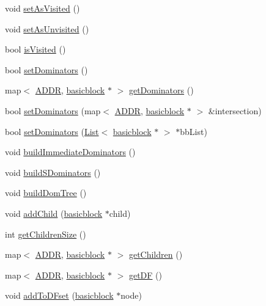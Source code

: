 \begin{DoxyCompactItemize}
\item 
void \hyperlink{classbasicblock_adb3d7c691e7974f77619409fe4a24335}{setAsVisited} ()
\item 
void \hyperlink{classbasicblock_a810b34c12cbddff700700341734ddc5d}{setAsUnvisited} ()
\item 
bool \hyperlink{classbasicblock_ad40cc70b314779ab7d0990813d3053d4}{isVisited} ()
\item 
bool \hyperlink{classbasicblock_aae21234b7ccd801b037a3a26a11d44e7}{setDominators} ()
\item 
map$<$ \hyperlink{binaryTranslator_2global_8h_aa4557b0650cb21e57e3e4623410832c6}{ADDR}, \hyperlink{classbasicblock}{basicblock} $\ast$ $>$ \hyperlink{classbasicblock_aec14cf5254976daec791c62e1b684ecf}{getDominators} ()
\item 
bool \hyperlink{classbasicblock_a9e417b7d2b2cb87281b4c8ed1b10d566}{setDominators} (map$<$ \hyperlink{binaryTranslator_2global_8h_aa4557b0650cb21e57e3e4623410832c6}{ADDR}, \hyperlink{classbasicblock}{basicblock} $\ast$ $>$ \&intersection)
\item 
bool \hyperlink{classbasicblock_aafd371f1d5701ae15546178a153ca23d}{setDominators} (\hyperlink{classList}{List}$<$ \hyperlink{classbasicblock}{basicblock} $\ast$ $>$ $\ast$bbList)
\item 
void \hyperlink{classbasicblock_a668baef0263404790b8b03e336b96dda}{buildImmediateDominators} ()
\item 
void \hyperlink{classbasicblock_ad88c3d7891025016b9de9f3bfb2b3ddb}{buildSDominators} ()
\item 
void \hyperlink{classbasicblock_a8e7863ba06ca7f2418f1f423e6f71e8a}{buildDomTree} ()
\item 
void \hyperlink{classbasicblock_abb47633a30d4722992c2d961a4a4ad14}{addChild} (\hyperlink{classbasicblock}{basicblock} $\ast$child)
\item 
int \hyperlink{classbasicblock_a150ce672b4864265713b242b74b3ca30}{getChildrenSize} ()
\item 
map$<$ \hyperlink{binaryTranslator_2global_8h_aa4557b0650cb21e57e3e4623410832c6}{ADDR}, \hyperlink{classbasicblock}{basicblock} $\ast$ $>$ \hyperlink{classbasicblock_a6dde8501c965eb860dcc5bf63fcb06f2}{getChildren} ()
\item 
map$<$ \hyperlink{binaryTranslator_2global_8h_aa4557b0650cb21e57e3e4623410832c6}{ADDR}, \hyperlink{classbasicblock}{basicblock} $\ast$ $>$ \hyperlink{classbasicblock_a3f8fdaf67559becd35119c53a47791c6}{getDF} ()
\item 
void \hyperlink{classbasicblock_abfaebb9413fe26d42607c09949e9d5cb}{addToDFset} (\hyperlink{classbasicblock}{basicblock} $\ast$node)

\end{DoxyCompactItemize}
